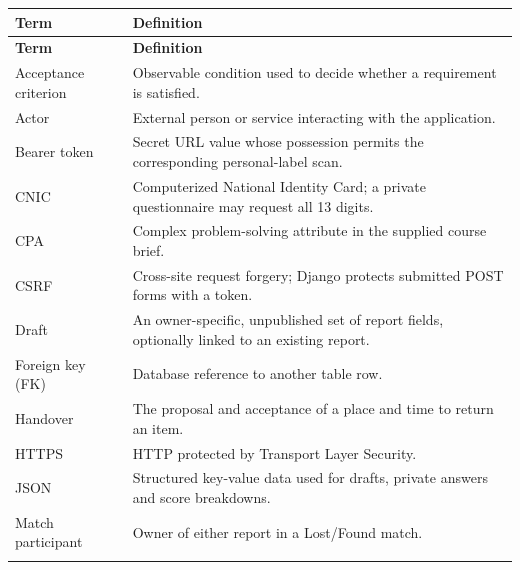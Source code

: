 \documentclass[12pt,a4paper,oneside]{report}
\begin{document}
\begin{longtable}{@{}P{0.27\dimexpr\textwidth-12pt\relax}P{0.73\dimexpr\textwidth-12pt\relax}@{}}

\toprule \textbf{Term} & \textbf{Definition} \\ \midrule\endfirsthead

\toprule \textbf{Term} & \textbf{Definition} \\ \midrule\endhead

\bottomrule\endfoot

Acceptance criterion & Observable condition used to decide whether a requirement is satisfied. \\ \addlinespace[3pt]

Actor & External person or service interacting with the application. \\ \addlinespace[3pt]

Bearer token & Secret URL value whose possession permits the corresponding personal-label scan. \\ \addlinespace[3pt]

CNIC & Computerized National Identity Card; a private questionnaire may request all 13 digits. \\ \addlinespace[3pt]

CPA & Complex problem-solving attribute in the supplied course brief. \\ \addlinespace[3pt]

CSRF & Cross-site request forgery; Django protects submitted POST forms with a token. \\ \addlinespace[3pt]

Draft & An owner-specific, unpublished set of report fields, optionally linked to an existing report. \\ \addlinespace[3pt]

Foreign key (FK) & Database reference to another table row. \\ \addlinespace[3pt]

Handover & The proposal and acceptance of a place and time to return an item. \\ \addlinespace[3pt]

HTTPS & HTTP protected by Transport Layer Security. \\ \addlinespace[3pt]

JSON & Structured key-value data used for drafts, private answers and score breakdowns. \\ \addlinespace[3pt]

Match participant & Owner of either report in a Lost/Found match. \\ \addlinespace[3pt]


\end{longtable}
\end{document}
